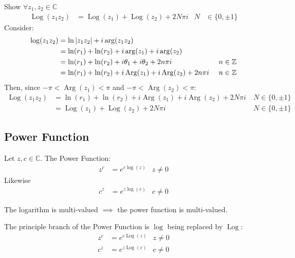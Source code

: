 \documentclass[12pt, english]{book}
\DeclareMathOperator\Log{Log}
\DeclareMathOperator\Arg{Arg}
\begin{document}
	\begin{example}
		Show \(\forall z_1, z_2 \in \mathbb{C}\)
		\begin{align*}
			\Log(z_1 z_2) &= \Log(z_1) + \Log(z_2) + 2N\pi i & N &\in \{0, \pm 1\}
		\end{align*}
		{\color{Grey}
		Consider:
		\begin{align*}
			\log(z_1 z_2) 
			&= \ln\abs{z_1 z_2} + i\arg(z_1 z_2) \\
			&= \ln(r_1) + \ln(r_2) + i\arg(z_1) + i\arg(z_2) \\
			&= \ln(r_1) + \ln(r_2) + i\theta_1 + i\theta_2 + 2n\pi i & \ n\in \mathbb{Z} \\
			&= \ln(r_1) + \ln(r_2) + i\Arg(z_1) + i\Arg(z_2) + 2n \pi i & \ n\in \mathbb{Z}
		\end{align*}
		Then, since \(-\pi < \Arg(z_1)<\pi\) and \(-\pi < \Arg(z_2)<\pi\):
		\begin{align*}
			\Log(z_1 z_2) 
			&= \ln(r_1) + \ln(r_2) + i\Arg(z_1) + i\Arg(z_2) + 2N \pi i & \ N\in \{0, \pm 1\} \\
			&=\Log(z_1) + \Log(z_2) + 2N \pi i & \ N\in \{0, \pm 1\} 
		\end{align*}
		}
	\end{example}

	\subsection{Power Function} \label{Power Function Subsection - Complex}
	
	\begin{definition}
		\label{Power Function Definition - Complex}
		Let \(z, c \in \mathbb{C}\). The Power Function: 
		\begin{align*}
			z^c &= e^{c \log(z)} & z\neq 0
		\end{align*}
		Likewise
		\begin{align*}
			c^z &= e^{z \log(c)} & c\neq 0
		\end{align*}
	\end{definition}
	The logarithm is multi-valued \(\implies\) the power function is multi-valued.
	
	The principle branch of the Power Function is \(\log\) being replaced by \(\Log\):
	\begin{align*}
		z^c &= e^{c \Log(z)} & z\neq 0 \\
		c^z &= e^{z \Log(c)} & c\neq 0
	\end{align*}
\end{document}
